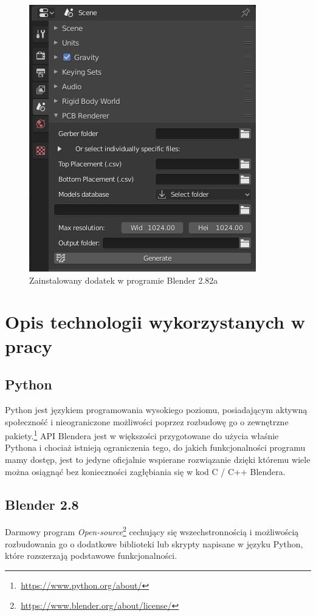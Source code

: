\documentclass{xmgr}
\begin{document}
\begin{figure}[!tbh]
\centering
\includegraphics[width=0.75\hsize]{fig/addon_1}
\caption{Zainstalowany dodatek w programie Blender 2.82a}
\end{figure}

\section {Opis technologii wykorzystanych w pracy}

\subsection{Python}
Python jest językiem programowania wysokiego poziomu, posiadającym aktywną społeczność i nieograniczone możliwości poprzez rozbudowę go o zewnętrzne pakiety.\footnote {\,\url{https://www.python.org/about/}} API Blendera jest w większości przygotowane do użycia właśnie Pythona i chociaż istnieją ograniczenia tego, do jakich funkcjonalności programu mamy dostęp, jest to jedyne oficjalnie wspierane rozwiązanie dzięki któremu wiele można osiągnąć bez konieczności zagłębiania się w kod C / C++ Blendera.

\subsection {Blender 2.8}
Darmowy program \emph{Open-source}\footnote{\,\url{https://www.blender.org/about/license/}} cechujący się wszechstronnością i możliwością rozbudowania go o dodatkowe biblioteki lub skrypty napisane w języku Python, które rozszerzają podstawowe funkcjonalności.
\end{document}

